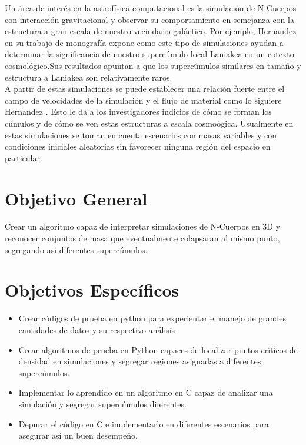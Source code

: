 \documentclass[12pt]{article}
\begin{document}
Un área de interés en la astrofísica computacional es la simulación de N-Cuerpos con interacción gravitacional y observar su comportamiento en semejanza con la estructura a gran escala de nuestro vecindario galáctico. Por ejemplo, Hernandez en su trabajo de monografía\cite{Hernandez} expone como este tipo de simulaciones ayudan a determinar la significancia de nuestro supercúmulo local Laniakea  en un cotexto cosmológico.Sus resultados apuntan a que los supercúmulos similares en tamaño  y estructura a Laniakea son relativamente raros.\\

A partir de estas simulaciones se puede establecer una relación fuerte entre el campo de velocidades de la simulación y el flujo de material como lo siguiere Hernandez . Esto le da a los investigadores indicios de cómo se forman los cúmulos y de cómo se ven estas estructuras a escala cosmoógica. Usualmente en estas simulaciones se toman en cuenta escenarios con masas variables y con condiciones iniciales aleatorias sin favorecer ninguna región del espacio en particular.

\section{Objetivo General}


Crear un algoritmo capaz de interpretar simulaciones de N-Cuerpos en 3D  y reconocer conjuntos de masa que eventualmente colapsaran al mismo punto, segregando así diferentes supercúmulos. 


\section{Objetivos Específicos}


\begin{itemize}
	\item Crear códigos de prueba en python para experientar el manejo de grandes cantidades de datos y su respectivo análisis
	\item Crear algoritmos de prueba en Python capaces de localizar puntos críticos de densidad en simulaciones y segregar regiones asignadas a diferentes supercúmulos.
	\item Implementar lo aprendido en un algoritmo en C capaz de analizar una simulación y segregar supercúmulos diferentes.
	\item Depurar el código en C e implementarlo en diferentes escenarios para asegurar así un buen desempeño.
\end{itemize}
\end{document}
